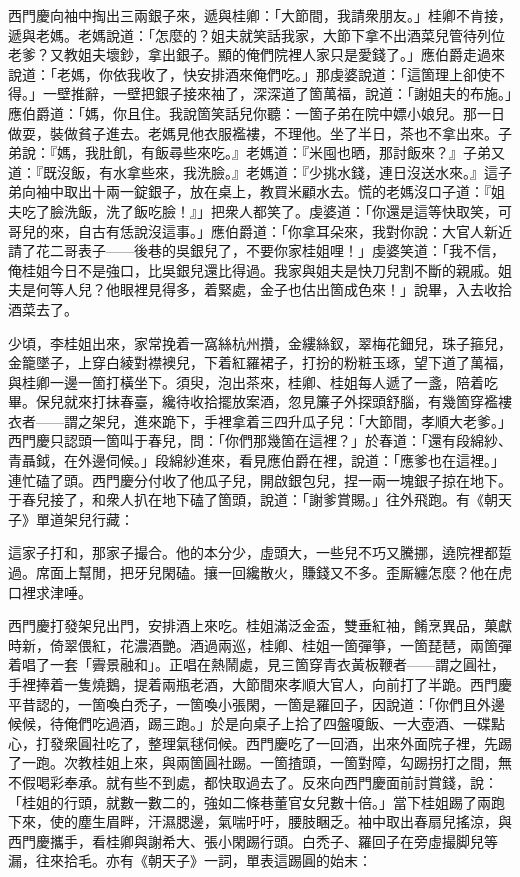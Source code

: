 西門慶向袖中掏出三兩銀子來，遞與桂卿：「大節間，我請衆朋友。」桂卿不肯接，遞與老媽。老媽說道：「怎麼的？姐夫就笑話我家，大節下拿不出酒菜兒管待列位老爹？又教姐夫壞鈔，拿出銀子。顯的俺們院裡人家只是愛錢了。」應伯爵走過來說道：「老媽，你依我收了，快安排酒來俺們吃。」那虔婆說道：「這箇理上卻使不得。」一壁推辭，一壁把銀子接來袖了，深深道了箇萬福，說道：「謝姐夫的布施。」{}應伯爵道：「媽，你且住。我說箇笑話兒你聽：{}一箇子弟在院中嫖小娘兒。那一日做耍，裝做貧子進去。老媽見他衣服襤褸，不理他。坐了半日，茶也不拿出來。子弟說：『媽，我肚飢，有飯尋些來吃。』老媽道：『米囤也晒，那討飯來？』子弟又道：『既沒飯，有水拿些來，我洗臉。』老媽道：『少挑水錢，連日沒送水來。』這子弟向袖中取出十兩一錠銀子，放在桌上，教買米顧水去。慌的老媽沒口子道：『姐夫吃了臉洗飯，洗了飯吃臉！』」把衆人都笑了。虔婆道：「你還是這等快取笑，可哥兒的來，自古有恁說沒這事。」{}應伯爵道：「你拿耳朵來，我對你說：大官人新近請了花二哥表子——{}後巷的吳銀兒了，不要你家桂姐哩！」虔婆笑道：「我不信，俺桂姐今日不是強口，比吳銀兒還比得過。我家與姐夫是快刀兒割不斷的親戚。{}姐夫是何等人兒？他眼裡見得多，着緊處，金子也估出箇成色來！」說畢，入去收拾酒菜去了。

少頃，李桂姐出來，家常挽着一窩絲杭州攢，金縷絲釵，翠梅花鈿兒，珠子箍兒，金籠墜子，上穿白綾對襟襖兒，下着紅羅裙子，打扮的粉粧玉琢，望下道了萬福，與桂卿一邊一箇打橫坐下。須臾，泡出茶來，桂卿、桂姐每人遞了一盞，陪着吃畢。保兒就來打抹春臺，纔待收拾擺放案酒，忽見簾子外探頭舒腦，有幾箇穿襤褸衣者——謂之架兒，{}進來跪下，手裡拿着三四升瓜子兒：「大節間，孝順大老爹。」西門慶只認頭一箇叫于春兒，問：「你們那幾箇在這裡？」於春道：「還有段綿紗、青聶鉞，在外邊伺候。」段綿紗進來，看見應伯爵在裡，說道：「應爹也在這裡。」連忙磕了頭。西門慶分付收了他瓜子兒，開啟銀包兒，捏一兩一塊銀子掠在地下。于春兒接了，和衆人扒在地下磕了箇頭，說道：「謝爹賞賜。」往外飛跑。有《朝天子》單道架兒行藏：

\begin{myquote}
這家子打和，那家子撮合。他的本分少，虛頭大，一些兒不巧又騰挪，遶院裡都踅過。席面上幫閒，把牙兒閑磕。攘一回纔散火，{}賺錢又不多。歪厮纏怎麼？他在虎口裡求津唾。
\end{myquote}

西門慶打發架兒出門，安排酒上來吃。桂姐滿泛金盃，雙垂紅袖，餚烹異品，菓獻時新，倚翠偎紅，花濃酒艷。酒過兩巡，桂卿、桂姐一箇彈箏，一箇琵琶，兩箇彈着唱了一套「霽景融和」。正唱在熱鬧處，見三箇穿青衣黃板鞭者——謂之圓社，手裡捧着一隻燒鵝，提着兩瓶老酒，大節間來孝順大官人，向前打了半跪。西門慶平昔認的，一箇喚白禿子，一箇喚小張閑，一箇是羅回子，{}因說道：「你們且外邊候候，待俺們吃過酒，踢三跑。」於是向桌子上拾了四盤嗄飯、一大壺酒、一碟點心，打發衆圓社吃了，整理氣毬伺候。西門慶吃了一回酒，出來外面院子裡，先踢了一跑。次教桂姐上來，與兩箇圓社踢。一箇揸頭，一箇對障，勾踢拐打之間，無不假喝彩奉承。就有些不到處，都快取過去了。反來向西門慶面前討賞錢，說：「桂姐的行頭，就數一數二的，強如二條巷董官女兒數十倍。」當下桂姐踢了兩跑下來，使的塵生眉畔，汗濕腮邊，氣喘吁吁，腰肢睏乏。袖中取出春扇兒搖涼，與西門慶攜手，看桂卿與謝希大、張小閑踢行頭。白禿子、羅回子在旁虛撮脚兒等漏，往來拾毛。亦有《朝天子》一詞，單表這踢圓的始末：

